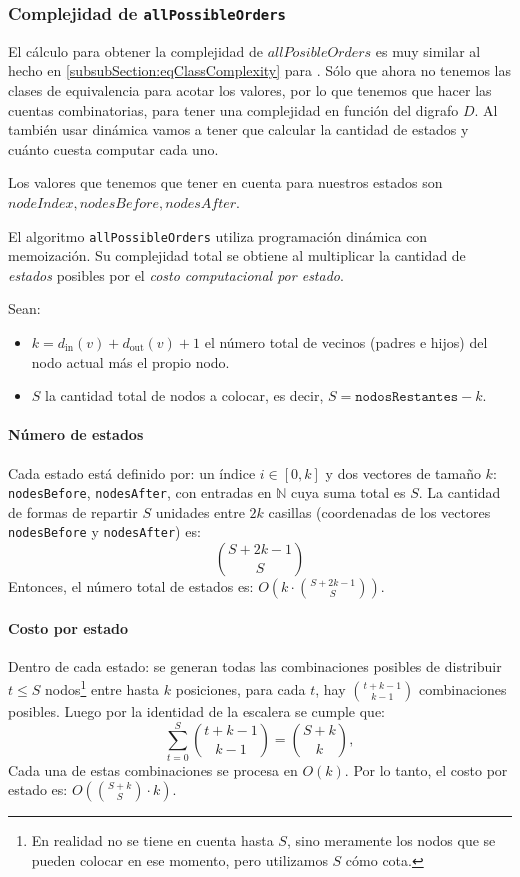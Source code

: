 \subsubsection{Complejidad de \texttt{allPossibleOrders}} \label{subsubSection:allPosibleOrdersComplexity}

El cálculo para obtener la complejidad de $allPosibleOrders$ es muy similar al hecho en \ref{subsubSection:eqClassComplexity} para \leftPossibleOrders. Sólo que ahora no tenemos las clases de equivalencia para acotar los valores, por lo que tenemos que hacer las cuentas combinatorias, para tener una complejidad en función del digrafo $D$. Al también usar dinámica vamos a tener que calcular la cantidad de estados y cuánto cuesta computar cada uno. 

Los valores que tenemos que tener en cuenta para nuestros estados son $nodeIndex, nodesBefore, nodesAfter$. 

El algoritmo \texttt{allPossibleOrders} utiliza programación dinámica con memoización. Su complejidad total se obtiene al multiplicar la cantidad de \emph{estados} posibles por el \emph{costo computacional por estado}.

Sean:
\begin{itemize}
    \item $k = d_{\text{in}}(v) + d_{\text{out}}(v) + 1$ el número total de vecinos (padres e hijos) del nodo actual más el propio nodo.
    \item $S$ la cantidad total de nodos a colocar, es decir, $S = \texttt{nodosRestantes} - k$.
\end{itemize}

\paragraph{Número de estados} Cada estado está definido por: un índice $i \in [0, k]$ y  dos vectores de tamaño $k$: \texttt{nodesBefore}, \texttt{nodesAfter}, con entradas en $\mathbb{N}$ cuya suma total es $S$. La cantidad de formas de repartir $S$ unidades entre $2k$ casillas (coordenadas de los vectores \texttt{nodesBefore} y \texttt{nodesAfter}) es:
\[
\binom{S + 2k - 1}{S}
\]
Entonces, el número total de estados es: $O\left(k \cdot \binom{S + 2k - 1}{S}\right).$

\paragraph{Costo por estado} Dentro de cada estado: se generan todas las combinaciones posibles de distribuir $t \leq S$ nodos\footnote{En realidad no se tiene en cuenta hasta $S$, sino meramente los nodos que se pueden colocar en ese momento, pero utilizamos $S$ cómo cota. } entre hasta $k$ posiciones, para cada $t$, hay $\binom{t + k - 1}{k - 1}$ combinaciones posibles. Luego por la identidad de la escalera se cumple que:
    \[
    \sum_{t=0}^{S} \binom{t + k - 1}{k - 1} = \binom{S + k}{k},
    \]
     Cada una de estas combinaciones se procesa en $O(k)$. Por lo tanto, el costo por estado es: $O\left(\binom{S + k}{S} \cdot k\right).$



